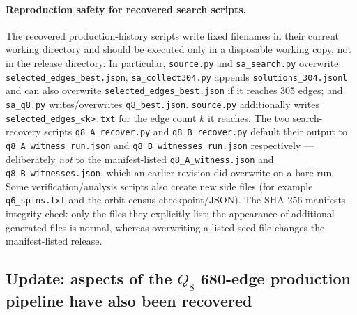\documentclass[12pt,a4paper]{article}
\theoremstyle{definition}
\begin{document}
\paragraph{Reproduction safety for recovered search scripts.}
The recovered production-history scripts write fixed filenames in their
current working directory and should be executed only in a disposable working
copy, not in the release directory. In particular, \texttt{source.py} and
\texttt{sa\_search.py} overwrite \texttt{selected\_edges\_best.json};
\texttt{sa\_collect304.py} appends \texttt{solutions\_304.jsonl} and can
also overwrite \texttt{selected\_edges\_best.json} if it reaches 305 edges;
and \texttt{sa\_q8.py} writes/overwrites \texttt{q8\_best.json}.
\texttt{source.py} additionally writes \texttt{selected\_edges\_<k>.txt} for
the edge count $k$ it reaches. The two search-recovery scripts
\texttt{q8\_A\_recover.py} and \texttt{q8\_B\_recover.py} default their output
to \texttt{q8\_A\_witness\_run.json} and \texttt{q8\_B\_witnesses\_run.json}
respectively --- deliberately \emph{not} to the manifest-listed
\texttt{q8\_A\_witness.json} and \texttt{q8\_B\_witnesses.json}, which an
earlier revision did overwrite on a bare run. Some
verification/analysis scripts also create new side files (for example
\texttt{q6\_spins.txt} and the orbit-census checkpoint/JSON). The SHA-256
manifests integrity-check only the files they explicitly list; the appearance of
additional generated files is normal, whereas overwriting a listed seed file
changes the manifest-listed release.

\subsection{Update: aspects of the \texorpdfstring{$Q_8$}{Q8} 680-edge production pipeline have also been recovered}
\end{document}
